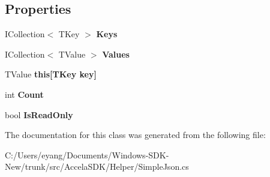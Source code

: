 \subsection*{Properties}
\begin{DoxyCompactItemize}
\item 
\hypertarget{class_accela_1_1_windows_store_s_d_k_1_1_reflection_1_1_reflection_utils_1_1_thread_safe_diction5b81ab04ca8096f86dab87845d097065_a79eda78b65ba9fc0328119dbbbb54b61}{I\+Collection$<$ T\+Key $>$ {\bfseries Keys}}\label{class_accela_1_1_windows_store_s_d_k_1_1_reflection_1_1_reflection_utils_1_1_thread_safe_diction5b81ab04ca8096f86dab87845d097065_a79eda78b65ba9fc0328119dbbbb54b61}

\item 
\hypertarget{class_accela_1_1_windows_store_s_d_k_1_1_reflection_1_1_reflection_utils_1_1_thread_safe_diction5b81ab04ca8096f86dab87845d097065_aa572e4ca057bd67575b66840278f7998}{I\+Collection$<$ T\+Value $>$ {\bfseries Values}}\label{class_accela_1_1_windows_store_s_d_k_1_1_reflection_1_1_reflection_utils_1_1_thread_safe_diction5b81ab04ca8096f86dab87845d097065_aa572e4ca057bd67575b66840278f7998}

\item 
\hypertarget{class_accela_1_1_windows_store_s_d_k_1_1_reflection_1_1_reflection_utils_1_1_thread_safe_diction5b81ab04ca8096f86dab87845d097065_abe83f7e2dd64269d9c7833b017d4c311}{T\+Value {\bfseries this\mbox{[}\+T\+Key key\mbox{]}}}\label{class_accela_1_1_windows_store_s_d_k_1_1_reflection_1_1_reflection_utils_1_1_thread_safe_diction5b81ab04ca8096f86dab87845d097065_abe83f7e2dd64269d9c7833b017d4c311}

\item 
\hypertarget{class_accela_1_1_windows_store_s_d_k_1_1_reflection_1_1_reflection_utils_1_1_thread_safe_diction5b81ab04ca8096f86dab87845d097065_a74e2eb31cf246373885f6f73160a08cc}{int {\bfseries Count}}\label{class_accela_1_1_windows_store_s_d_k_1_1_reflection_1_1_reflection_utils_1_1_thread_safe_diction5b81ab04ca8096f86dab87845d097065_a74e2eb31cf246373885f6f73160a08cc}

\item 
\hypertarget{class_accela_1_1_windows_store_s_d_k_1_1_reflection_1_1_reflection_utils_1_1_thread_safe_diction5b81ab04ca8096f86dab87845d097065_a28acc1a06ccfb09a5ae761a65e428e4f}{bool {\bfseries Is\+Read\+Only}}\label{class_accela_1_1_windows_store_s_d_k_1_1_reflection_1_1_reflection_utils_1_1_thread_safe_diction5b81ab04ca8096f86dab87845d097065_a28acc1a06ccfb09a5ae761a65e428e4f}

\end{DoxyCompactItemize}


The documentation for this class was generated from the following file\+:\begin{DoxyCompactItemize}
\item 
C\+:/\+Users/eyang/\+Documents/\+Windows-\/\+S\+D\+K-\/\+New/trunk/src/\+Accela\+S\+D\+K/\+Helper/Simple\+Json.\+cs\end{DoxyCompactItemize}
